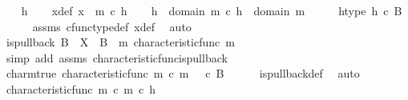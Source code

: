 \begin{isabellebody}
\ \ \isamarkupfalse%
\ h\isanewline
\ \ \isamarkupfalse%
\ x{\isacharunderscore}{\kern0pt}def{\isacharcolon}{\kern0pt}\ {\isachardoublequoteopen}x\ {\isacharequal}{\kern0pt}\ m\ {\isasymcirc}\isactrlsub c\ h{\isachardoublequoteclose}\isanewline
\ \ \isamarkupfalse%
\ {\isachardoublequoteopen}h\ {\isacharcolon}{\kern0pt}\ domain\ {\isacharparenleft}{\kern0pt}m\ {\isasymcirc}\isactrlsub c\ h{\isacharparenright}{\kern0pt}\ {\isasymrightarrow}\ domain\ m{\isachardoublequoteclose}\isanewline
\ \ \isamarkupfalse%
\ \isamarkupfalse%
\ h{\isacharunderscore}{\kern0pt}type{\isacharcolon}{\kern0pt}\ {\isachardoublequoteopen}h\ {\isasymin}\isactrlsub c\ B{\isachardoublequoteclose}\isanewline
\ \ \ \ \isamarkupfalse%
\ assms{\isacharparenleft}{\kern0pt}{}{\isacharcomma}{\kern0pt}{}{\isacharparenright}{\kern0pt}\ cfunc{\isacharunderscore}{\kern0pt}type{\isacharunderscore}{\kern0pt}def\ x{\isacharunderscore}{\kern0pt}def\ \isamarkupfalse%
\ auto\isanewline
\isanewline
\ \ \isamarkupfalse%
\ {\isachardoublequoteopen}is{\isacharunderscore}{\kern0pt}pullback\ B\ {\isasymone}\ X\ {\isasymOmega}\ {\isacharparenleft}{\kern0pt}{\isasymbeta}\isactrlbsub B\isactrlesub {\isacharparenright}{\kern0pt}\ {\isasymt}\ m\ {\isacharparenleft}{\kern0pt}characteristic{\isacharunderscore}{\kern0pt}func\ m{\isacharparenright}{\kern0pt}{\isachardoublequoteclose}\isanewline
\ \ \ \ \isamarkupfalse%
\ {\isacharparenleft}{\kern0pt}simp\ add{\isacharcolon}{\kern0pt}\ assms\ characteristic{\isacharunderscore}{\kern0pt}func{\isacharunderscore}{\kern0pt}is{\isacharunderscore}{\kern0pt}pullback{\isacharparenright}{\kern0pt}\isanewline
\ \ \isamarkupfalse%
\ \isamarkupfalse%
\ char{\isacharunderscore}{\kern0pt}m{\isacharunderscore}{\kern0pt}true{\isacharcolon}{\kern0pt}\ {\isachardoublequoteopen}characteristic{\isacharunderscore}{\kern0pt}func\ m\ {\isasymcirc}\isactrlsub c\ m\ {\isacharequal}{\kern0pt}\ {\isasymt}\ {\isasymcirc}\isactrlsub c\ {\isasymbeta}\isactrlbsub B\isactrlesub {\isachardoublequoteclose}\isanewline
\ \ \ \ \isamarkupfalse%
\ is{\isacharunderscore}{\kern0pt}pullback{\isacharunderscore}{\kern0pt}def\ \isamarkupfalse%
\ auto\isanewline
\isanewline
\ \ \isamarkupfalse%
\ \isamarkupfalse%
\ {\isachardoublequoteopen}characteristic{\isacharunderscore}{\kern0pt}func\ m\ {\isasymcirc}\isactrlsub c\ m\ {\isasymcirc}\isactrlsub c\ h\ {\isacharequal}{\kern0pt}\ {\isasymf}{\isachardoublequoteclose}\isanewline

\end{isabellebody}
